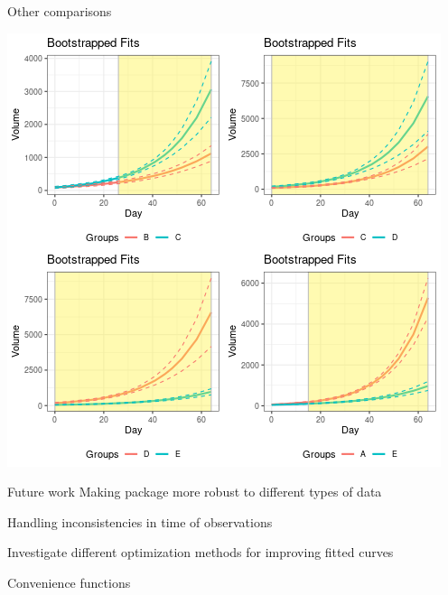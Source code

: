 \documentclass{beamer}
\begin{document}
\begin{frame}{Other comparisons}
\begin{center}
\includegraphics[scale=0.45]{img/four_boot.png}
\end{center}
\end{frame}


\begin{frame}{Future work}
Making package more robust to different types of data \newline 

Handling inconsistencies in time of observations \newline 

Investigate different optimization methods for improving fitted curves \newline 

Convenience functions \newline

\end{frame}
\end{document}
